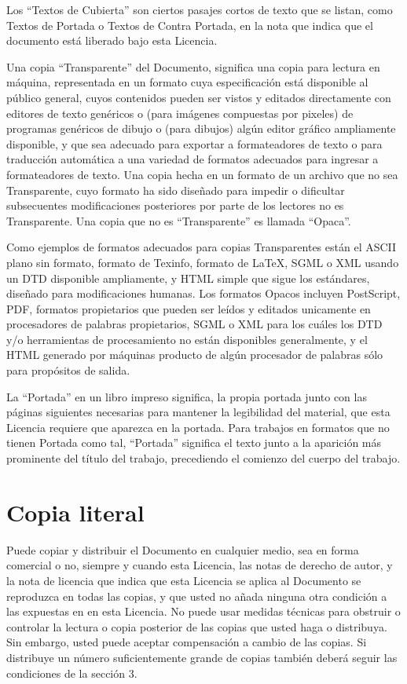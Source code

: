 Los ``Textos de Cubierta'' son ciertos  pasajes cortos de texto que se
listan, como Textos de Portada o  Textos de Contra Portada, en la nota
que indica que el documento está liberado bajo esta Licencia.

Una  copia ``Transparente''  del Documento,  significa una  copia para
lectura  en máquina,  representada en  un formato  cuya especificación
está disponible al público general, cuyos contenidos pueden ser vistos
y  editados  directamente con  editores  de  texto genéricos  o  (para
imágenes compuestas  por pixeles) de  programas genéricos de  dibujo o
(para dibujos) algún editor gráfico  ampliamente disponible, y que sea
adecuado  para exportar  a formateadores  de texto  o para  traducción
automática  a  una variedad  de  formatos  adecuados para  ingresar  a
formateadores de  texto. Una copia hecha  en un formato de  un archivo
que no sea Transparente, cuyo formato  ha sido diseñado para impedir o
dificultar subsecuentes  modificaciones posteriores  por parte  de los
lectores no es  Transparente. Una copia que no  es ``Transparente'' es
llamada ``Opaca''.

Como ejemplos de formatos adecuados para copias Transparentes están el
ASCII plano sin formato, formato de  Texinfo, formato de LaTeX, SGML o
XML usando un DTD disponible ampliamente,  y HTML simple que sigue los
estándares, diseñado para modificaciones  humanas. Los formatos Opacos
incluyen PostScript, PDF, formatos  propietarios que pueden ser leídos
y editados unicamente en procesadores de palabras propietarios, SGML o
XML para los cuáles los DTD y/o herramientas de procesamiento no están
disponibles generalmente, y el HTML  generado por máquinas producto de
algún procesador de palabras sólo para propósitos de salida.

La ``Portada'' en un libro  impreso significa, la propia portada junto
con las páginas siguientes necesarias para mantener la legibilidad del
material, que esta Licencia requiere  que aparezca en la portada. Para
trabajos  en formatos  que  no tienen  Portada  como tal,  ``Portada''
significa el texto junto a la  aparición más prominente del título del
trabajo, precediendo el comienzo del cuerpo del trabajo.


\section{Copia literal}

Puede  copiar y  distribuir el  Documento en  cualquier medio,  sea en
forma comercial  o no, siempre  y cuando  esta Licencia, las  notas de
derecho de autor,  y la nota de licencia que  indica que esta Licencia
se aplica al Documento se reproduzca  en todas las copias, y que usted
no añada ninguna  otra condición a las expuestas en  en esta Licencia.
No puede usar medidas técnicas para  obstruir o controlar la lectura o
copia  posterior  de las  copias  que  usted  haga o  distribuya.  Sin
embargo, usted puede  aceptar compensación a cambio de  las copias. Si
distribuye un  número suficientemente grande de  copias también deberá
seguir las condiciones de la sección 3.

